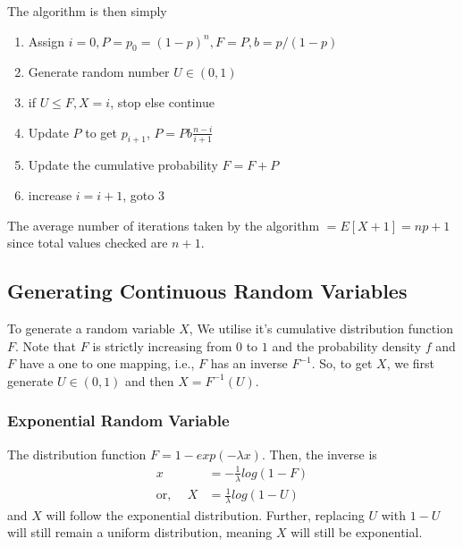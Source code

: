 \documentclass[../probability-notes.tex]{subfiles}
\begin{document}
    The algorithm is then simply
    \begin{enumerate}
        \item Assign $i = 0, P = p_{0} = (1-p)^{n}, F = P, b = p/(1-p)$
        \item Generate random number $U \in (0, 1)$
        \item if $U \leq F, X = i$, stop else continue
        \item Update $P$ to get $p_{i+1}$, $P = Pb\frac{n-i}{i+1}$
        \item Update the cumulative probability $F = F + P$
        \item increase $i = i + 1$, goto 3
    \end{enumerate}

    The average number of iterations taken by the algorithm $= E[X + 1] = np + 1$ since total values checked are $n + 1$.


    \subsection{Generating Continuous Random Variables}
    To generate a random variable $X$, We utilise it's cumulative distribution function $F$. Note that $F$ is strictly increasing from $0$ to $1$ and the probability density $f$ and $F$ have a one to one mapping, i.e., $F$ has an inverse $F^{-1}$. So, to get $X$, we first generate $U \in (0, 1)$ and then $X = F^{-1}(U)$.\newline

    \subsubsection{Exponential Random Variable}
    The distribution function $F = 1 - exp(-\lambda x)$. Then, the inverse is
    \begin{align*}
        x &= -\frac{1}{\lambda}log(1 - F)\\
        \text{or, }\quad X &= \frac{1}{\lambda}log(1 - U)
    \end{align*}
    and $X$ will follow the exponential distribution. Further, replacing $U$ with $1-U$ will still remain a uniform distribution, meaning $X$ will still be exponential.

    
\end{document}
